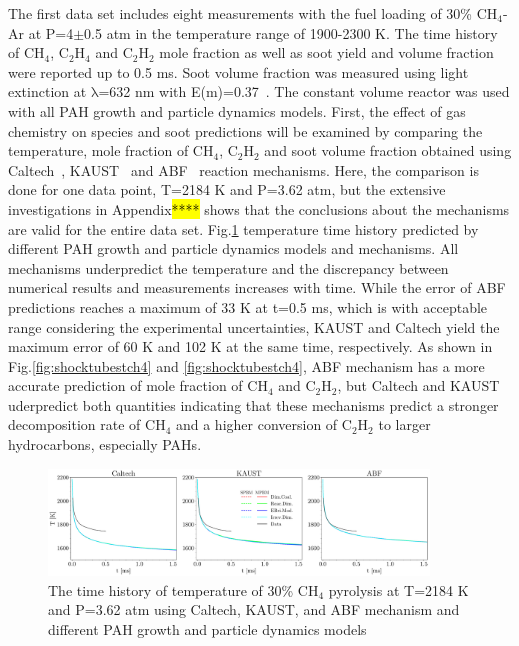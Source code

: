 The first data set includes eight measurements with the fuel loading of 30\% $\mathrm{CH_4}$-Ar at P=4$\pm$0.5 atm in the temperature range of 1900-2300 K. The time history of $\mathrm{CH_4}$, $\mathrm{C_2H_4}$ and $\mathrm{C_2H_2}$ mole fraction as well as soot yield and volume fraction were reported up to 0.5 ms. Soot volume fraction was measured using light extinction at $\mathrm{\lambda}$=632 nm with E(m)=0.37~\citep{agafonov2015soot}. The constant volume reactor was used with all PAH growth and particle dynamics models. First, the effect of gas chemistry on species and soot predictions will be examined by comparing the temperature, mole fraction of $\mathrm{CH_4}$, $\mathrm{C_2H_2}$ and soot volume fraction obtained using Caltech~\citep{blanquart2009chemical}, KAUST~\cite{wang2013pah} and ABF~\citep{appel2000kinetic} reaction mechanisms. Here, the comparison is done for one data point, T=2184 K and P=3.62 atm, but the extensive investigations in Appendix\hl{****} shows that the conclusions about the mechanisms are valid for the entire data set. Fig.\ref{fig:shocktubestT} temperature time history predicted by different PAH growth and particle dynamics models and mechanisms. All mechanisms underpredict the temperature and the discrepancy between numerical results and measurements increases with time. While the error of ABF predictions reaches a maximum of 33 K at t=0.5 ms, which is with acceptable range considering the experimental uncertainties, KAUST and Caltech yield the maximum error of 60 K and 102 K at the same time, respectively. As shown in Fig.\ref{fig:shocktubestch4} and \ref{fig:shocktubestch4}, ABF mechanism has a more accurate prediction of mole fraction of $\mathrm{CH_4}$ and $\mathrm{C_2H_2}$, but Caltech and KAUST uderpredict both quantities indicating that these mechanisms predict a stronger  decomposition rate of $\mathrm{CH_4}$ and a higher conversion of $\mathrm{C_2H_2}$ to larger hydrocarbons, especially PAHs. 

\begin{figure}[H]
	\centering
	\includegraphics[width=0.9\textwidth]{Figures/Results/Shocktube/Stanford/june/stsh_mech_compare_T.pdf}
	\caption{The time history of temperature of 30\% $\mathrm{CH_4}$ pyrolysis at T=2184 K and P=3.62 atm using Caltech, KAUST, and ABF mechanism and different PAH growth and particle dynamics models}
	\label{fig:shocktubestT} 
\end{figure}

